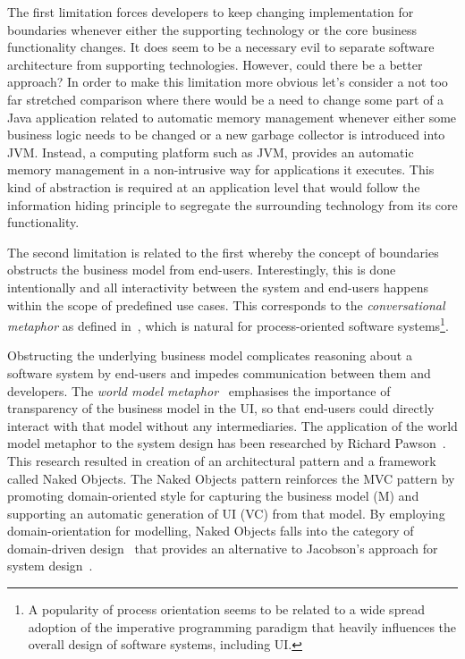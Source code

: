  The first limitation forces developers to keep changing implementation for boundaries whenever either the supporting technology or the core business functionality changes.
  It does seem to be a necessary evil to separate software architecture from supporting technologies.
  However, could there be a better approach?  
  In order to make this limitation more obvious let's consider a not too far stretched comparison where there would be a need to change some part of a Java application related to automatic memory management whenever either some business logic needs to be changed or a new garbage collector is introduced into JVM.
  Instead, a computing platform such as JVM, provides an automatic memory management in a non-intrusive way for applications it executes.
  This kind of abstraction is required at an application level that would follow the information hiding principle to segregate the surrounding technology from its core functionality.
  
  The second limitation is related to the first whereby the concept of boundaries obstructs the business model from end-users.
  Interestingly, this is done intentionally and all interactivity between the system and end-users happens within the scope of predefined use cases.
  This corresponds to the \emph{conversational metaphor} as defined in~\cite{HHN1986}, which is natural for process-oriented software systems\footnote{A popularity of process orientation seems to be related to a wide spread adoption of the imperative programming paradigm that heavily influences the overall design of software systems, including UI.}.
  
  Obstructing the underlying business model complicates reasoning about a software system by end-users and impedes communication between them and developers.  
  The \emph{world model metaphor}~\cite{HHN1986} emphasises the importance of transparency of the business model in the UI, so that end-users could directly interact with that model without any intermediaries.
  The application of the world model metaphor to the system design has been researched by Richard Pawson~\cite{pawson2001, pawson2004}.
  This research resulted in creation of an architectural pattern and a framework called Naked Objects.
  The Naked Objects pattern reinforces the MVC pattern by promoting domain-oriented style for capturing the business model (M) and supporting an automatic generation of UI (VC) from that model.
  By employing domain-orientation for modelling, Naked Objects falls into the category of domain-driven design~\cite{haywood2009} that provides an alternative to Jacobson's approach for system design~\cite{evans2003, vernon2013}.
  
